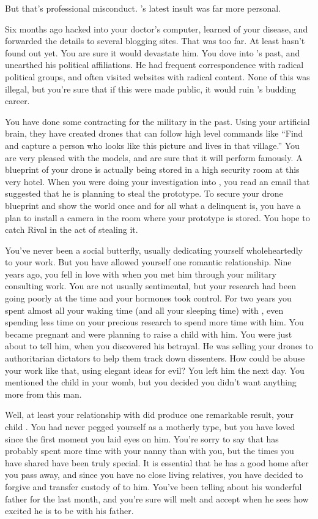 \documentclass[char]{guildcamp1}
\begin{document}
But that's professional misconduct. \cRival{}'s latest insult was far more personal.

Six months ago \cRival{} hacked into your doctor's computer, learned of your disease, and forwarded the details to several blogging sites. That was too far. At least \cKid{} hasn't found out yet. You are sure it would devastate him. You dove into \cRival{}'s past, and unearthed his political affiliations. He had frequent correspondence with radical political groups, and often visited websites with radical content. None of this was illegal, but you're sure that if this were made public, it would ruin \cRival{}'s budding career.

You have done some contracting for the military in the past.  Using your artificial brain, they have created drones that can follow high level commands like ``Find and capture a person who looks like this picture and lives in that village.''  You are very pleased with the models, and are sure that it will perform famously.  A blueprint of your drone is actually being stored in a high security room at this very hotel.  When you were doing your investigation into \cRival{}, you read an email that suggested that he is planning to steal the prototype.  To secure your drone blueprint and show the world once and for all what a delinquent \cRival{} is, you have a plan to install a camera in the room where your prototype is stored.  You hope to catch Rival in the act of stealing it.

You've never been a social butterfly, usually dedicating yourself wholeheartedly to your work. But you have allowed yourself one romantic relationship.  Nine years ago, you fell in love with \cGroomA{\intro{}} when you met him through your military consulting work.  You are not usually sentimental, but your research had been going poorly at the time and your hormones took control. For two years you spent almost all your waking time (and all your sleeping time) with \cGroomA{}, even spending less time on your precious research to spend more time with him.  You became pregnant and were planning to raise a child with him. You were just about to tell him, when you discovered his betrayal.  He was selling your drones to authoritarian dictators to help them track down dissenters.  How could be abuse your work like that, using elegant ideas for evil?  You left him the next day.  You mentioned the child in your womb, but you decided you didn't want anything more from this man.
 
Well, at least your relationship with \cGroomA{} did produce one remarkable result, your child \cKid{}. You had never pegged yourself as a motherly type, but you have loved \cKid{} since the first moment you laid eyes on him.  You're sorry to say that \cKid{} has probably spent more time with your nanny than with you, but the times you have shared have been truly special.  It is essential that he has a good home after you pass away, and since you have no close living relatives, you have decided to forgive \cGroomA{} and transfer custody of \cKid{} to him.  You've been telling \cKid{} about his wonderful father for the last month, and you're sure \cGroomA{} will melt and accept \cKid{} when he sees how excited he is to be with his father.
\end{document}
